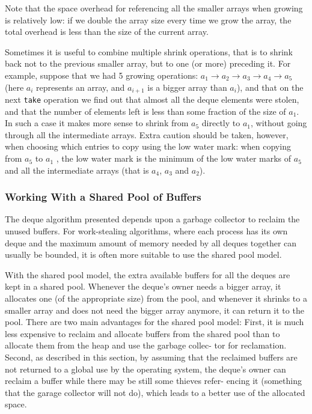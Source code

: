 Note that the space overhead for referencing all the smaller arrays
when growing is relatively low: if we double the array size every time
we grow the array, the total overhead is less than the size of the
current array.


Sometimes it is useful to combine multiple shrink operations, that is
to shrink back not to the previous smaller array, but to one (or more)
preceding it. For example, suppose that we had 5 growing operations:
$a_1 \rightarrow a_2 \rightarrow a_3 \rightarrow a_4 \rightarrow a_5$
(here $a_i$ represents an array, and $a_{i+1}$ is a bigger array than
$a_i$), and that on the next \lstinline!take! operation we find
out that almost all the deque elements were stolen, and that the
number of elements left is less than some fraction of the size of
$a_1$. In such a case it makes more sense to shrink from $a_5$
directly to $a_1$, without going through all the intermediate
arrays. Extra caution should be taken, however, when choosing which
entries to copy using the low water mark: when copying from $a_5$ to
$a_1$ , the low water mark is the minimum of the low water marks of
$a_5$ and all the intermediate arrays (that is $a_4$, $a_3$ and
$a_2$).

\subsubsection{Working With a Shared Pool of Buffers}

The deque algorithm presented depends upon a garbage collector to
reclaim the unused buffers. For work-stealing algorithms, where each
process has its own deque and the maximum amount of memory needed by
all deques together can usually be bounded, it is often more suitable
to use the shared pool model.

With the shared pool model, the extra available buffers for all the
deques are kept in a shared pool. Whenever the deque's owner needs a
bigger array, it allocates one (of the appropriate size) from the
pool, and whenever it shrinks to a smaller array and does not need the
bigger array anymore, it can return it to the pool. There are two main
advantages for the shared pool model: First, it is much less expensive
to reclaim and allocate buffers from the shared pool than to allocate
them from the heap and use the garbage collec- tor for
reclamation. Second, as described in this section, by assuming that
the reclaimed buffers are not returned to a global use by the
operating system, the deque's owner can reclaim a buffer while there
may be still some thieves refer- encing it (something that the garage
collector will not do), which leads to a better use of the allocated
space.


